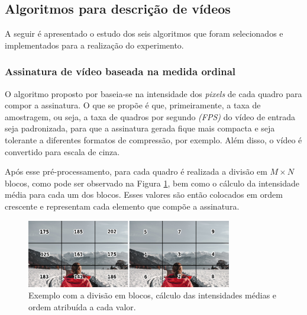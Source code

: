 \subsection{Algoritmos para descrição de vídeos}
	A seguir é apresentado o estudo dos seis algoritmos que foram selecionados e implementados para a realização do experimento.


%
%
\subsubsection{Assinatura de vídeo baseada na medida ordinal}
\label{sec:med_ordinal}

	O algoritmo proposto por \citeauthor{hua2004robust} baseia-se na intensidade dos \textit{pixels} de cada quadro para compor a assinatura. O que se propõe é que, primeiramente, a taxa de amostragem, ou seja, a taxa de quadros por segundo \textit{(FPS)} do vídeo de entrada seja padronizada, para que a assinatura gerada fique mais compacta e seja tolerante a diferentes formatos de compressão, por exemplo. Além disso, o vídeo é convertido para escala de cinza.

Após esse pré-processamento, para cada quadro é realizada a divisão em $M \times N$ blocos, como pode ser observado na Figura \ref{fig:medidaord}, bem como o cálculo da intensidade média para cada um dos blocos. Esses valores são então colocados em ordem crescente e representam cada elemento que compõe a assinatura.

	\begin{figure}[h]
        \centering
        \includegraphics[width=0.8\textwidth]{dados/figuras/mo_final.png}
        \caption{Exemplo com a divisão em blocos, cálculo das intensidades médias e ordem atribuída a cada valor.}
        \label{fig:medidaord}
    \end{figure}

